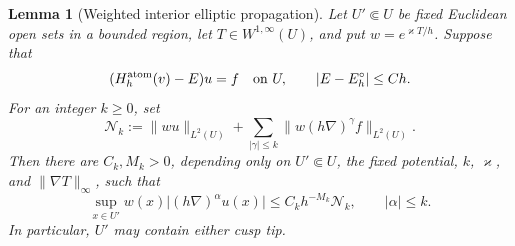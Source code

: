 \documentclass[11pt]{article}
\newtheorem{lemma}[theorem]{Lemma}
\begin{document}
\begin{lemma}[Weighted interior elliptic propagation]
\label{lem:weighted-interior-elliptic-propagation}
Let $U'\Subset U$ be fixed Euclidean open sets in a bounded region, let
$T\in W^{1,\infty}(U)$, and put $w=e^{\varkappa T/h}$.  Suppose that
\[
 (H_h^{\rm atom}(v)-E)u=f\quad\hbox{on }U,
 \qquad |E-E_h^\circ|\le Ch.
\]
For an integer $k\ge0$, set
\[
 \mathcal N_k:=\|wu\|_{L^2(U)}
 +\sum_{|\gamma|\le k}\|w(h\nabla)^\gamma f\|_{L^2(U)}.
\]
Then there are $C_k,M_k>0$, depending only on $U'\Subset U$, the fixed
potential, $k$, $\varkappa$, and $\|\nabla T\|_\infty$, such that
\begin{equation}\label{eq:weighted-elliptic}
 \sup_{x\in U'}w(x)\bigl|(h\nabla)^\alpha u(x)\bigr|
 \le C_kh^{-M_k}\mathcal N_k,
 \qquad |\alpha|\le k.
\end{equation}
In particular, $U'$ may contain either cusp tip.
\end{lemma}
\end{document}
